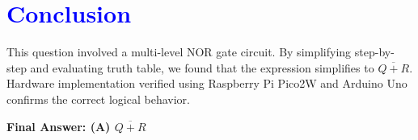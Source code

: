 \documentclass[twocolumn]{article}
\begin{document}
\section*{\textcolor{blue}{Conclusion}}

This question involved a multi-level NOR gate circuit. By simplifying step-by-step and evaluating truth table, we found that the expression simplifies to $\overline{Q + R}$. Hardware implementation verified using Raspberry Pi Pico2W and Arduino Uno confirms the correct logical behavior.

\textbf{Final Answer: (A) $\overline{Q + R}$}
\end{document}
